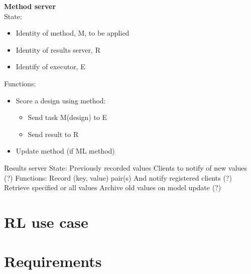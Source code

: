 \documentclass[10pt]{article}
\begin{document}
\noindent
\textbf{Method server}\\
State:
\begin{itemize}
\itemsep-0.3em 
\item
Identity of method, M, to be applied
\item
Identity of results server, R
\item
Identify of executor, E
\end{itemize}
Functions:
\begin{itemize}
\itemsep-0.3em 
\item 
Score a design using method:
\begin{itemize}
\itemsep-0.3em 
\item
Send task M(design) to E
\item
Send result to R
\end{itemize}
\item
Update method (if ML method) 
\end{itemize}

Results server
State:
Previously recorded values
Clients to notify of new values (?)
Functions:
Record (key, value) pair(s)
And notify registered clients (?)
Retrieve specified or all values
Archive old values on model update (?)



\section{RL use case}





\section{Requirements}
\end{document}
